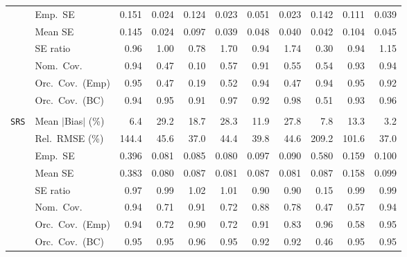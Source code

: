 \begin{landscape}
\begin{longtable}{llrrrrrrrrr}
 & Emp.\ SE & 0.151 & 0.024 & 0.124 & 0.023 & 0.051 & 0.023 & 0.142 & 0.111 & 0.039 \\
 & Mean SE & 0.145 & 0.024 & 0.097 & 0.039 & 0.048 & 0.040 & 0.042 & 0.104 & 0.045 \\
 & SE ratio & \cellcolor{ranktwo}0.96 & \cellcolor{rankone}1.00 & 0.78 & 1.70 & \cellcolor{rankthree}0.94 & 1.74 & 0.30 & \cellcolor{rankthree}0.94 & 1.15 \\
 & Nom.\ Cov. & \cellcolor{rankone}0.94 & 0.47 & 0.10 & 0.57 & \cellcolor{rankthree}0.91 & 0.55 & 0.54 & \cellcolor{ranktwo}0.93 & \cellcolor{rankone}0.94 \\
 & Orc.\ Cov.\ (Emp) & \cellcolor{rankone}0.95 & 0.47 & 0.19 & 0.52 & \cellcolor{ranktwo}0.94 & 0.47 & \cellcolor{ranktwo}0.94 & \cellcolor{rankone}0.95 & \cellcolor{rankthree}0.92 \\
 & Orc.\ Cov.\ (BC) & \cellcolor{rankone}0.94 & \cellcolor{rankone}0.95 & 0.91 & \cellcolor{ranktwo}0.97 & \cellcolor{rankthree}0.92 & \cellcolor{rankthree}0.98 & 0.51 & \cellcolor{ranktwo}0.93 & \cellcolor{rankone}0.96 \\
\addlinespace[2pt]
\multicolumn{11}{l}{\textbf{Binary \& Categorical Phase-One Covariates}} \\
\addlinespace[2pt]
\quad \texttt{SRS} & Mean $|$Bias$|$ (\%) & \cellcolor{ranktwo}6.4 & 29.2 & 18.7 & 28.3 & 11.9 & 27.8 & \cellcolor{rankthree}7.8 & 13.3 & \cellcolor{rankone}3.2 \\
 & Rel.\ RMSE (\%) & 144.4 & 45.6 & \cellcolor{rankone}37.0 & \cellcolor{rankthree}44.4 & \cellcolor{ranktwo}39.8 & 44.6 & 209.2 & 101.6 & \cellcolor{rankone}37.0 \\
 & Emp.\ SE & 0.396 & 0.081 & 0.085 & 0.080 & 0.097 & 0.090 & 0.580 & 0.159 & 0.100 \\
 & Mean SE & 0.383 & 0.080 & 0.087 & 0.081 & 0.087 & 0.081 & 0.087 & 0.158 & 0.099 \\
 & SE ratio & \cellcolor{rankthree}0.97 & \cellcolor{rankone}0.99 & \cellcolor{ranktwo}1.02 & \cellcolor{rankone}1.01 & 0.90 & 0.90 & 0.15 & \cellcolor{rankone}0.99 & \cellcolor{rankone}0.99 \\
 & Nom.\ Cov. & \cellcolor{rankone}0.94 & 0.71 & \cellcolor{ranktwo}0.91 & 0.72 & \cellcolor{rankthree}0.88 & 0.78 & 0.47 & 0.57 & \cellcolor{rankone}0.94 \\
 & Orc.\ Cov.\ (Emp) & \cellcolor{ranktwo}0.94 & 0.72 & 0.90 & 0.72 & \cellcolor{rankthree}0.91 & 0.83 & \cellcolor{ranktwo}0.96 & 0.58 & \cellcolor{rankone}0.95 \\
 & Orc.\ Cov.\ (BC) & \cellcolor{rankone}0.95 & \cellcolor{rankone}0.95 & \cellcolor{ranktwo}0.96 & \cellcolor{rankone}0.95 & \cellcolor{rankthree}0.92 & \cellcolor{rankthree}0.92 & 0.46 & \cellcolor{rankone}0.95 & \cellcolor{rankone}0.95 \\

\end{longtable}
\end{landscape}
